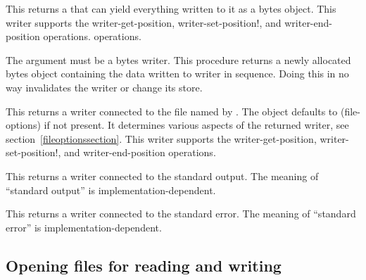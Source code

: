 \begin{entry}{%
}
   
This returns a  that can yield everything written to it as
a bytes object. This writer supports the {\cf writer-get-position},
{\cf writer-set-position!}, and {\cf writer-end-position} operations.
operations.
\end{entry}

\begin{entry}{%
}
   
The  argument must be a bytes writer.  This procedure
returns a newly allocated bytes object containing the data written to
writer in sequence. Doing this in no way invalidates the writer or
change its store.
\end{entry}

\begin{entry}{%
}
   
This returns a writer connected to the file named by .
The  object defaults to {\cf (file-options)} if not
present. It determines various aspects of the returned writer, see
section~\ref{fileoptionssection}.  This writer supports the {\cf writer-get-position},
{\cf writer-set-position!}, and {\cf writer-end-position} operations.
\end{entry}

\begin{entry}{%
}
   
This returns a writer connected to the standard output. The meaning of
``standard output'' is implementation-dependent.
\end{entry}

\begin{entry}{%
}
   
This returns a writer connected to the standard error. The meaning of
``standard error'' is implementation-dependent.
\end{entry}   

\subsection{Opening files for reading and writing}

